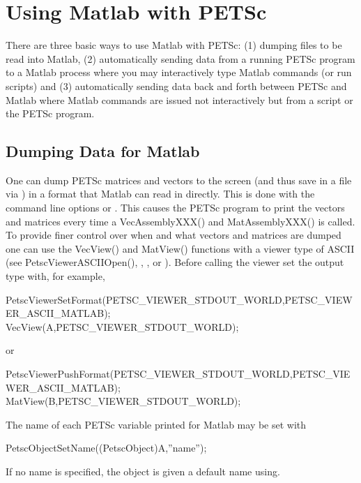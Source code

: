 \chapter{Using Matlab with PETSc}
\label{ch_matlab}

There are three basic ways to use Matlab with PETSc: (1) dumping files to 
be read into Matlab, (2) automatically sending data from a running PETSc program
to a Matlab process where you may interactively type Matlab commands (or run
scripts) and (3) automatically sending data back and forth between PETSc and 
Matlab where Matlab commands are issued not interactively but from a script or
the PETSc program.

\section{Dumping Data for Matlab}
One can dump PETSc matrices and vectors to the screen (and thus save in a file via
) in a format that Matlab can read in directly. This is done with the
command line options  or . This causes the PETSc program
to print the vectors and matrices every time a VecAssemblyXXX() and MatAssemblyXXX()
is called.   To provide finer control
over when and what vectors and matrices are dumped one can use the VecView() and 
MatView() functions with a viewer type of ASCII (see PetscViewerASCIIOpen(), 
, , or ). Before calling
the viewer set the output type with, for example, 
\begin{tabbing}
  PetscViewerSetFormat(PETSC\_VIEWER\_STDOUT\_WORLD,PETSC\_VIEWER\_ASCII\_MATLAB);\\
  VecView(A,PETSC\_VIEWER\_STDOUT\_WORLD);
\end{tabbing}
or 
\begin{tabbing}
  PetscViewerPushFormat(PETSC\_VIEWER\_STDOUT\_WORLD,PETSC\_VIEWER\_ASCII\_MATLAB);\\
  MatView(B,PETSC\_VIEWER\_STDOUT\_WORLD);
\end{tabbing}
The name of each PETSc variable printed for Matlab may be set with
\begin{tabbing}
PetscObjectSetName((PetscObject)A,''name'');
\end{tabbing}
If no name is specified, the object is given a default name using.

